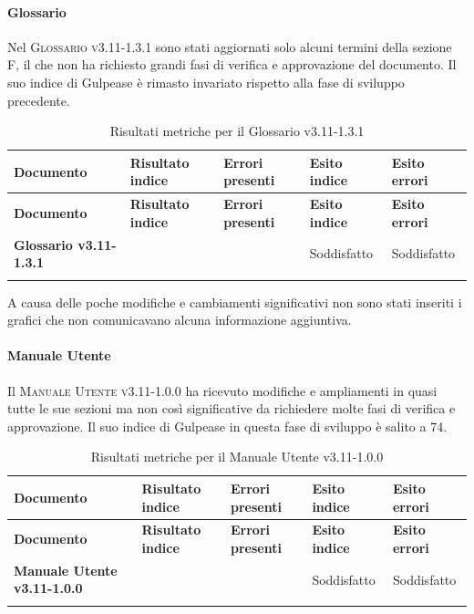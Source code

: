 \paragraph{Glossario}
\label{sub:glossario}
Nel \textsc{Glossario v3.11-1.3.1} sono stati aggiornati solo alcuni termini della sezione F, il che non ha richiesto grandi fasi di verifica e approvazione del documento.
Il suo indice di Gulpease è rimasto invariato rispetto alla fase di sviluppo precedente.

\renewcommand{\arraystretch}{2} %
\begin{longtable}[H]{>{\centering\bfseries}m{6cm} >{\centering}m{2cm} >{\centering}m{2.5cm} >{\centering}m{2.5cm} >{\centering\arraybackslash}m{2.5cm}}  
  \rowcolor{lightgray}
  {\textbf{Documento}} & {\textbf{Risultato indice}} & {\textbf{Errori presenti}} & {\textbf{Esito indice}} & {\textbf{Esito errori}}  \\
  \endfirsthead%
  \rowcolor{lightgray}
  {\textbf{Documento}} & {\textbf{Risultato indice}} & {\textbf{Errori presenti}} & {\textbf{Esito indice}} & {\textbf{Esito errori}}  \\
  \endhead%
  \textbf{Glossario v3.11-1.3.1} & 65               & 0               & Soddisfatto & Soddisfatto \\
  \caption{Risultati metriche per il Glossario v3.11-1.3.1}
  \label{tab:my-table}
\end{longtable}

A causa delle poche modifiche e cambiamenti significativi non sono stati inseriti i grafici che non comunicavano alcuna informazione aggiuntiva.

\paragraph{Manuale Utente}
\label{sub:manuale_utente}
Il \textsc{Manuale Utente v3.11-1.0.0} ha ricevuto modifiche e ampliamenti in quasi tutte le sue sezioni ma non così significative da richiedere molte fasi di verifica e approvazione.
Il suo indice di Gulpease in questa fase di sviluppo è salito a 74.

\renewcommand{\arraystretch}{2} %
\begin{longtable}[H]{>{\centering\bfseries}m{6cm} >{\centering}m{2cm} >{\centering}m{2.5cm} >{\centering}m{2.5cm} >{\centering\arraybackslash}m{2.5cm}}  
  \rowcolor{lightgray}
  {\textbf{Documento}} & {\textbf{Risultato indice}} & {\textbf{Errori presenti}} & {\textbf{Esito indice}} & {\textbf{Esito errori}}  \\
  \endfirsthead%
  \rowcolor{lightgray}
  {\textbf{Documento}} & {\textbf{Risultato indice}} & {\textbf{Errori presenti}} & {\textbf{Esito indice}} & {\textbf{Esito errori}}  \\
  \endhead%
  \textbf{Manuale Utente v3.11-1.0.0} & 74               & 0               & Soddisfatto & Soddisfatto \\
  \caption{Risultati metriche per il Manuale Utente v3.11-1.0.0}
  \label{tab:my-table}
\end{longtable}

